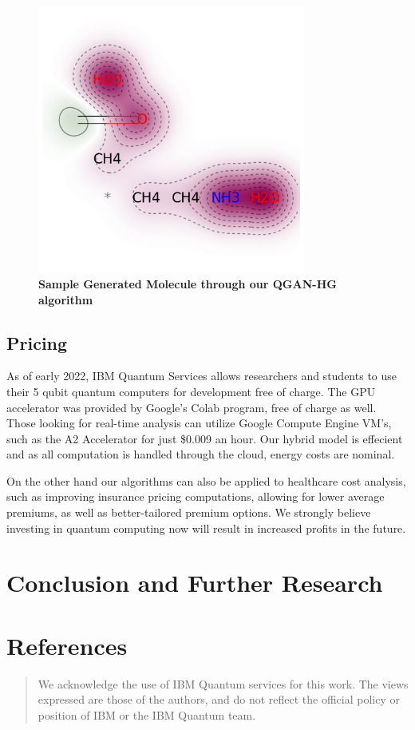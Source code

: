 \documentclass{scrartcl}
\begin{document}
\begin{figure}[htbp]
\centering
\includegraphics[width=250pt]{./assets/output4.png}
\caption{\textbf{Sample Generated Molecule through our QGAN-HG algorithm}}
\end{figure}

\subsection{Pricing}
\label{sec:org1ac401b}

As of early 2022, IBM Quantum Services allows researchers and students to use their 5 qubit quantum computers for development free of charge. The GPU accelerator was provided by Google's Colab program, free of charge as well. Those looking for real-time analysis can utilize Google Compute Engine VM's, such as the A2 Accelerator for just \$0.009 an hour. Our hybrid model is effecient and as all computation is handled through the cloud, energy costs are nominal.

On the other hand our algorithms can also be applied to healthcare cost analysis, such as improving insurance pricing computations, allowing for lower average premiums, as well as better-tailored premium options. We strongly believe investing in quantum computing now will result in increased profits in the future.

\section{Conclusion and Further Research}
\label{sec:org16f8dc5}

\section{References}
\label{sec:org6f3443d}

\printbibliography

\begin{quote}
We acknowledge the use of IBM Quantum services for this work. The views expressed are those of the authors, and do not reflect the official policy or position of IBM or the IBM Quantum team.
\end{quote}
\end{document}
